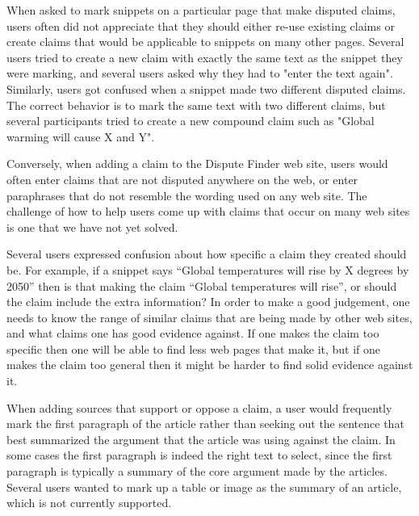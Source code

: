 \documentclass{www2010-submission}
\begin{document}
%

When asked to mark snippets on a particular page that make disputed claims, users often did not appreciate that they should either re-use existing claims or create claims that would be applicable to snippets on many other pages. Several users tried to create a new claim with exactly the same text as the snippet they were marking, and several users asked why they had to "enter the text again". Similarly, users got confused when a snippet made two different disputed claims. The correct behavior is to mark the same text with two different claims, but several participants tried to create a new compound claim such as "Global warming will cause X and Y". 

Conversely, when adding a claim to the Dispute Finder web site, users would often enter claims that are not disputed anywhere on the web, or enter paraphrases that do not resemble the wording used on any web site. The challenge of how to help users come up with claims that occur on many web sites is one that we have not yet solved.

Several users expressed confusion about how specific a claim they created should be. For example, if a snippet says ``Global temperatures will rise by X degrees by 2050'' then is that making the claim ``Global temperatures will rise'', or should the claim include the extra information? In order to make a good judgement, one needs to know the range of similar claims that are being made by other web sites, and what claims one has good evidence against. If one makes the claim too specific then one will be able to find less web pages that make it, but if one makes the claim too general then it might be harder to find solid evidence against it.

When adding sources that support or oppose a claim, a user would frequently mark the first paragraph of the article rather than seeking out the sentence that best summarized the argument that the article was using against the claim. In some cases the first paragraph is indeed the right text to select, since the first paragraph is typically a summary of the core argument made by the articles. Several users wanted to mark up a table or image as the summary of an article, which is not currently supported.
\end{document}

